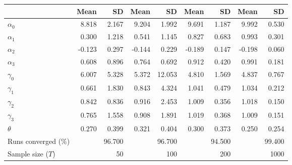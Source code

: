 
\begin{tabular}[t]{lrrrrrrrr}
\toprule
  & Mean & SD & Mean  & SD  & Mean   & SD   & Mean    & SD   \\
\midrule
$\alpha_{0}$ & 8.818 & 2.167 & 9.204 & 1.992 & 9.691 & 1.187 & 9.992 & 0.530\\
$\alpha_{1}$ & 0.300 & 1.218 & 0.541 & 1.145 & 0.827 & 0.683 & 0.993 & 0.301\\
$\alpha_{2}$ & -0.123 & 0.297 & -0.144 & 0.229 & -0.189 & 0.147 & -0.198 & 0.060\\
$\alpha_{3}$ & 0.608 & 0.896 & 0.764 & 0.692 & 0.912 & 0.420 & 0.991 & 0.181\\
$\gamma_{0}$ & 6.007 & 5.328 & 5.372 & 12.053 & 4.810 & 1.569 & 4.837 & 0.767\\
$\gamma_{1}$ & 0.661 & 1.830 & 0.843 & 4.324 & 1.041 & 0.479 & 1.034 & 0.212\\
$\gamma_{2}$ & 0.842 & 0.836 & 0.916 & 2.453 & 1.009 & 0.356 & 1.018 & 0.150\\
$\gamma_{3}$ & 0.765 & 1.558 & 0.908 & 1.891 & 1.019 & 0.368 & 1.009 & 0.151\\
$\theta$ & 0.270 & 0.399 & 0.321 & 0.404 & 0.300 & 0.373 & 0.250 & 0.254\\
Runs converged (\%) &  & 96.700 &  & 96.700 &  & 94.500 &  & 99.400\\
Sample size ($T$) &  & 50 &  & 100 &  & 200 &  & 1000\\
\bottomrule
\end{tabular}
